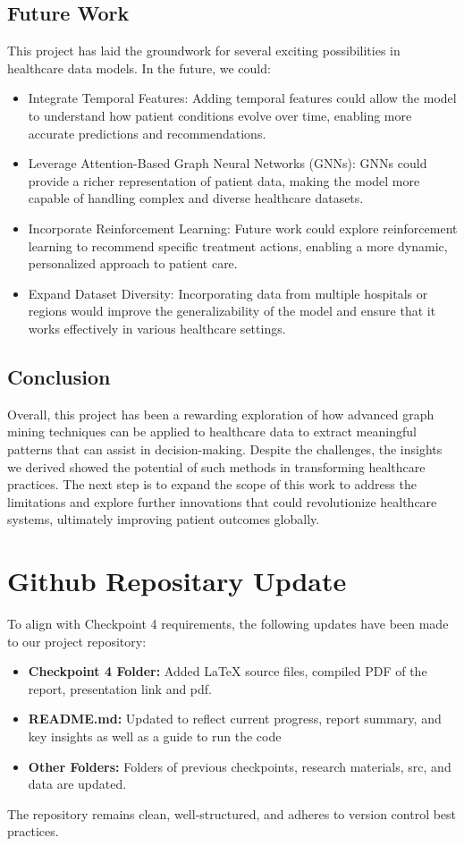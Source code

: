 \documentclass[11pt]{article}
\begin{document}
\subsection{Future Work}

This project has laid the groundwork for several exciting possibilities in healthcare data models. In the future, we could:

\begin{itemize}
    \item Integrate Temporal Features: Adding temporal features could allow the model to understand how patient conditions evolve over time, enabling more accurate predictions and recommendations.
    \item Leverage Attention-Based Graph Neural Networks (GNNs): GNNs could provide a richer representation of patient data, making the model more capable of handling complex and diverse healthcare datasets.
    \item Incorporate Reinforcement Learning: Future work could explore reinforcement learning to recommend specific treatment actions, enabling a more dynamic, personalized approach to patient care.
    \item Expand Dataset Diversity: Incorporating data from multiple hospitals or regions would improve the generalizability of the model and ensure that it works effectively in various healthcare settings.
\end{itemize}

\subsection{Conclusion}

Overall, this project has been a rewarding exploration of how advanced graph mining techniques can be applied to healthcare data to extract meaningful patterns that can assist in decision-making. Despite the challenges, the insights we derived showed the potential of such methods in transforming healthcare practices. The next step is to expand the scope of this work to address the limitations and explore further innovations that could revolutionize healthcare systems, ultimately improving patient outcomes globally.


\section{Github Repositary Update}
To align with Checkpoint 4 requirements, the following updates have been made to our project repository:

\begin{itemize}[noitemsep]
    \item \textbf{Checkpoint 4 Folder:} Added LaTeX source files, compiled PDF of the report, presentation link and pdf. 
    \item \textbf{README.md:} Updated to reflect current progress, report summary, and key insights as well as a guide to run the code
    \item \textbf{Other Folders:} Folders of previous checkpoints, research materials, src, and data are updated. 
    
\end{itemize}
The repository remains clean, well-structured, and adheres to version control best practices.
\end{document}
